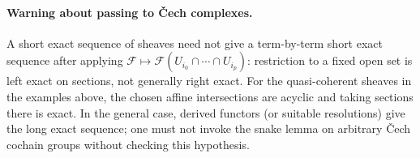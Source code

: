 \paragraph{Warning about passing to \v{C}ech complexes.}
A short exact sequence of sheaves need not give a
term-by-term short exact sequence after applying
$\mathcal F\mapsto\mathcal F(U_{i_0}\cap\cdots\cap U_{i_p})$:
restriction to a fixed open set is left exact on sections,
not generally right exact.  For the quasi-coherent sheaves
in the examples above, the chosen affine intersections
are acyclic and taking sections there is exact.  In the
general case, derived functors (or suitable resolutions)
give the long exact sequence; one must not invoke the
snake lemma on arbitrary \v{C}ech cochain groups without
checking this hypothesis.
